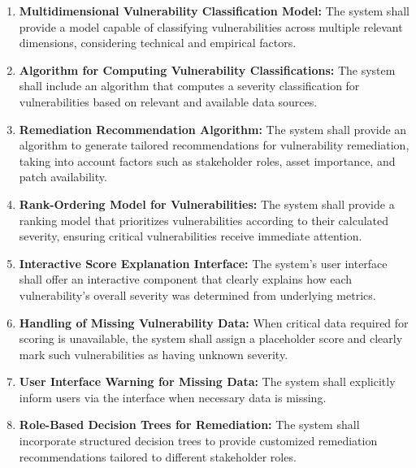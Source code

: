 \begin{enumerate}
	
	\item \label{req:multidimensional_classification}
	    \textbf{Multidimensional Vulnerability Classification Model:} The system shall provide a model capable of classifying vulnerabilities across multiple relevant dimensions, considering technical and empirical factors.
	      
	\item \label{req:classification_algorithm}
	      \textbf{Algorithm for Computing Vulnerability Classifications:} The system shall include an algorithm that computes a severity classification for vulnerabilities based on relevant and available data sources.
	      
	\item \label{req:remediation_algorithm}
	      \textbf{Remediation Recommendation Algorithm:} The system shall provide an algorithm to generate tailored recommendations for vulnerability remediation, taking into account factors such as stakeholder roles, asset importance, and patch availability.
	      
	\item \label{req:vulnerability_ranking_model}
	      \textbf{Rank-Ordering Model for Vulnerabilities:} The system shall provide a ranking model that prioritizes vulnerabilities according to their calculated severity, ensuring critical vulnerabilities receive immediate attention.
	      
	\item \label{req:interactive_explanation}
	      \textbf{Interactive Score Explanation Interface:} The system's user interface shall offer an interactive component that clearly explains how each vulnerability's overall severity was determined from underlying metrics.
	      
	\item \label{req:missing_data_handling}
	      \textbf{Handling of Missing Vulnerability Data:} When critical data required for scoring is unavailable, the system shall assign a placeholder score and clearly mark such vulnerabilities as having unknown severity.
	      
	\item \label{req:frontend_warning_missing_data}
	      \textbf{User Interface Warning for Missing Data:} The system shall explicitly inform users via the interface when necessary data is missing.
	      
	\item \label{req:ssvc_decision_tree}
	      \textbf{Role-Based Decision Trees for Remediation:} The system shall incorporate structured decision trees to provide customized remediation recommendations tailored to different stakeholder roles.
	      

\end{enumerate}
